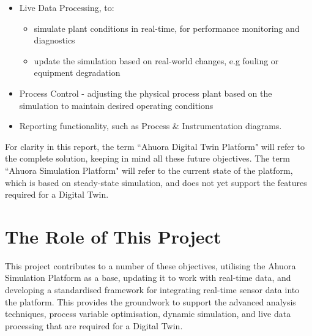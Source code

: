 \begin{itemize}
    \item Live Data Processing, to:
          \begin{itemize}
              \item simulate plant conditions in real-time, for performance monitoring and diagnostics
              \item update the simulation based on real-world changes, e.g fouling or equipment degradation
          \end{itemize}
    \item Process Control - adjusting the physical process plant based on the simulation to maintain desired operating conditions
    \item Reporting functionality, such as Process \& Instrumentation diagrams.
\end{itemize}

For clarity in this report, the term ``Ahuora Digital Twin Platform" will refer to the complete solution, keeping in mind all these future objectives. The term ``Ahuora Simulation Platform" will refer to the current state of the platform, which is based on steady-state simulation, and does not yet support the features required for a Digital Twin.

\section{The Role of This Project}

This project contributes to a number of these objectives, utilising the Ahuora Simulation Platform as a base, updating it to work with real-time data, and developing a standardised framework for integrating real-time sensor data into the platform. This provides the groundwork to support the advanced analysis techniques, process variable optimisation, dynamic simulation, and live data processing that are required for a Digital Twin.
